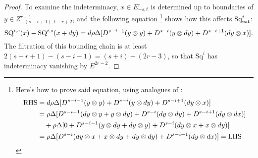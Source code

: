 \documentclass[11pt]{amsart}
\theoremstyle{plain}
\theoremstyle{definition}
\theoremstyle{plain}
\newcommand{\Sq}{\mathrm{Sq}}
\begin{document}
\begin{External spectral sequence operations}
\begin{proof}
To examine the indeterminacy, $x\in E^r_{-s,t}$ is determined up to boundaries of $y\in Z^{r-1}_{-(s-r+1),t-r+2}$, and the following equation%
\footnote{Here's how to prove said equation, using analogues of \cite[(1.111),(1.112)]{MR2245560}:
\begin{alignat*}{2}
\textup{RHS}
&=
d\rho\Delta [D^{s-i-1}(y\otimes y)+D^{s-i}(y\otimes dy)+D^{s-i+1}(dy\otimes x)]%
\\
&=
\rho\Delta [D^{s-i-1}(dy\otimes y+y\otimes dy)+D^{s-i}(dy\otimes dy)+D^{s-i+1}(dy\otimes dx)]%
\\
&\ \ \ +
\rho\Delta [0+D^{s-i-1}(y\otimes dy+dy\otimes y)+D^{s-i}(dy\otimes x+x\otimes dy)]%
\\
&=
\rho\Delta [D^{s-i}(dy\otimes x+x\otimes dy+dy\otimes dy)
+D^{s-i+1}(dy\otimes dx)]=\textup{LHS}%
\end{alignat*}} shows how this affects $\Sq^{i}_\textup{ext}$:
\[\textup{SQ}^{i,s}(x)-\textup{SQ}^{i,s}(x+dy)=d\rho\Delta [D^{s-i-1}(y\otimes y)+D^{s-i}(y\otimes dy)+D^{s-i+1}(dy\otimes x)].\]
The filtration of this bounding chain is at least $2(s-r+1)-(s-i-1)=(s+i)-(2r-3)$, so that $\Sq^i$ has indeterminacy vanishing by $E^{2r-2}$.


\end{proof}
\end{External spectral sequence operations}
\end{document}
